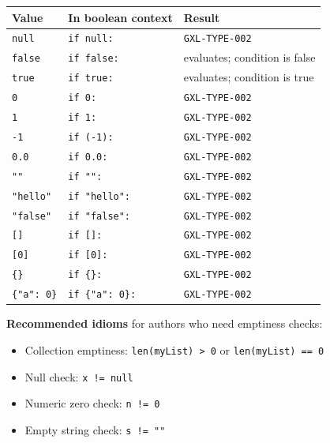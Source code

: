 \begin{center}
\begin{tabular}{lll}
\hline
\textbf{Value}            & \textbf{In boolean context} & \textbf{Result} \\
\hline
\texttt{null}             & \texttt{if null:}           & \texttt{GXL-TYPE-002} \\
\texttt{false}            & \texttt{if false:}          & evaluates; condition is false \\
\texttt{true}             & \texttt{if true:}           & evaluates; condition is true \\
\texttt{0}                & \texttt{if 0:}              & \texttt{GXL-TYPE-002} \\
\texttt{1}                & \texttt{if 1:}              & \texttt{GXL-TYPE-002} \\
\texttt{-1}               & \texttt{if (-1):}           & \texttt{GXL-TYPE-002} \\
\texttt{0.0}              & \texttt{if 0.0:}            & \texttt{GXL-TYPE-002} \\
\texttt{""}               & \texttt{if "":}             & \texttt{GXL-TYPE-002} \\
\texttt{"hello"}          & \texttt{if "hello":}        & \texttt{GXL-TYPE-002} \\
\texttt{"false"}          & \texttt{if "false":}        & \texttt{GXL-TYPE-002} \\
\texttt{[]}               & \texttt{if []:}             & \texttt{GXL-TYPE-002} \\
\texttt{[0]}              & \texttt{if [0]:}            & \texttt{GXL-TYPE-002} \\
\texttt{\{\}}             & \texttt{if \{\}:}           & \texttt{GXL-TYPE-002} \\
\texttt{\{"a": 0\}}       & \texttt{if \{"a": 0\}:}    & \texttt{GXL-TYPE-002} \\
\hline
\end{tabular}
\end{center}

\noindent\textbf{Recommended idioms} for authors who need emptiness checks:

\begin{itemize}
  \item Collection emptiness: \texttt{len(myList) > 0} or \texttt{len(myList) == 0}
  \item Null check: \texttt{x != null}
  \item Numeric zero check: \texttt{n != 0}
  \item Empty string check: \texttt{s != ""}
\end{itemize}

